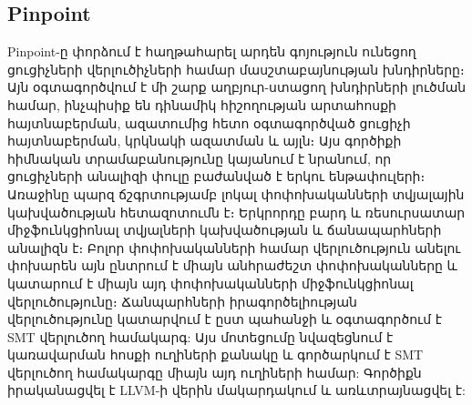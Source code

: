 \subsection{Pinpoint}
Pinpoint\cite{Qingkai2018}-ը փորձում է հաղթահարել արդեն գոյություն ունեցող ցուցիչների վերլուծիչների համար մասշտաբայնության
խնդիրները։
Այն օգտագործվում է մի շարք աղբյուր-ստացող խնդիրների լուծման համար, ինչպիսիք են դինամիկ հիշողության արտահոսքի հայտնաբերման,
ազատումից հետո օգտագործված ցուցիչի հայտնաբերման, կրկնակի ազատման և այլն։ Այս գործիքի հիմնական տրամաբանությունը կայանում է
նրանում, որ ցուցիչների անալիզի փուլը բաժանված է երկու ենթափուլերի։ Առաջինը պարզ ճշգրտությամբ լոկալ փոփոխականների տվյալային
կախվածության հետազոտումն է։ Երկրորդը բարդ և ռեսուրսատար միջֆունկցիոնալ տվյալների կախվածության և ճանապարհների անալիզն է։
Բոլոր փոփոխականների համար վերլուծություն անելու փոխարեն այն ընտրում է միայն անհրաժեշտ փոփոխականները և կատարում է միայն
այդ փոփոխականների միջֆունկցիոնալ վերլուծությունը։ Ճանպարհների իրագործելիության վերլուծությունը կատարվում է ըստ պահանջի
և օգտագործում է SMT վերլուծող համակարգ: Այս մոտեցումը նվազեցնում է կառավարման հոսքի ուղիների քանակը և գործարկում է SMT
վերլուծող համակարգը միայն այդ ուղիների համար: Գործիքն իրականացվել է LLVM-ի վերին մակարդակում և առևտրայնացվել է\cite{Pinpoint}:
